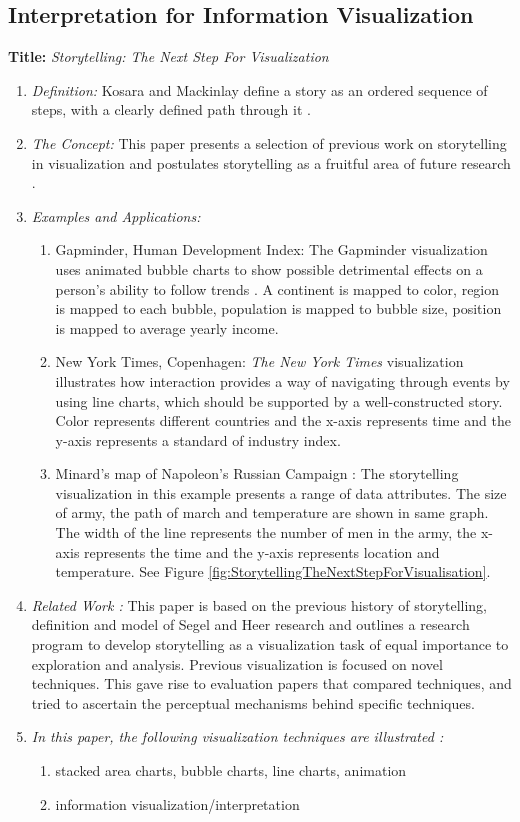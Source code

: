 \documentclass{egpubl}
\begin{document}
\subsection{Interpretation for Information Visualization}
\textbf{Title:} \textit{Storytelling: The Next Step For Visualization}
\begin{enumerate}
\item \textit{Definition:} Kosara and Mackinlay define a story as an ordered sequence of steps, with a clearly defined path through it \cite{Kosara}.
\item \textit{The Concept:} This paper presents a selection of previous work on storytelling in visualization and postulates storytelling as a fruitful area of future research \cite{Kosara}.
\item  \textit{Examples and Applications:} 
\begin{enumerate}
\item Gapminder, Human Development Index: The Gapminder visualization uses animated bubble charts to show possible detrimental effects on a person's ability to follow trends \cite{Rebortson}. A continent is mapped to color, region is mapped to each bubble, population is mapped to bubble size, position is mapped to average yearly income.
\item New York Times, Copenhagen: \textit{The New York Times} visualization illustrates how interaction provides a way of navigating through events by using line charts, which should be supported by a well-constructed story. Color represents different countries and the x-axis represents time and the y-axis represents a standard of industry index.
\item Minard's map of Napoleon's Russian Campaign : The storytelling visualization in this example presents a range of data attributes.  The size of army, the path of march and temperature are shown in same graph. The width of the line represents the number of men in the army, the x-axis represents the time and the y-axis represents location and temperature. See Figure \ref{fig:StorytellingTheNextStepForVisualisation}.
\end{enumerate}
\item \textit{Related Work :} This paper is based on  the previous history of storytelling, definition and model of Segel and Heer research \cite{segal} and outlines a research program to develop storytelling as a visualization task of equal importance to exploration and analysis. Previous visualization is focused on novel techniques. This gave rise to evaluation papers 
that compared techniques, and tried to ascertain the perceptual mechanisms behind specific techniques.
\item \textit{In this paper, the following visualization techniques are illustrated :} 
\begin{enumerate}
\item stacked area charts, bubble charts, line charts, animation
\item information visualization/interpretation
\end{enumerate}
\end{enumerate}
\end{document}
